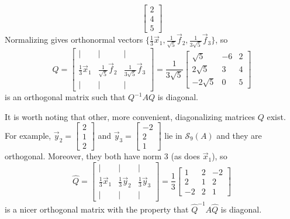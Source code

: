 \documentclass{ximera}
\begin{document}
\begin{example}
\begin{explanation}
\begin{equation*}
\begin{bmatrix}
2 \\
4 \\
5
\end{bmatrix}
\end{equation*}
Normalizing gives orthonormal vectors $\{\frac{1}{3}\vec{x}_{1}, \frac{1}{\sqrt{5}}\vec{f}_{2}, \frac{1}{3\sqrt{5}}\vec{f}_{3}\}$, so
\begin{equation*}
Q = \begin{bmatrix}
| & | &  | \\
\frac{1}{3}\vec{x}_{1} & \frac{1}{\sqrt{5}}\vec{f}_{2} & \frac{1}{3\sqrt{5}}\vec{f}_{3} \\
| & | &  | 
\end{bmatrix} = \frac{1}{3\sqrt{5}}\begin{bmatrix}
\sqrt{5} & -6 & 2 \\
2\sqrt{5} & 3 & 4 \\
-2\sqrt{5} & 0 & 5
\end{bmatrix}
\end{equation*}
is an orthogonal matrix such that $Q^{-1}AQ$ is diagonal.


It is worth noting that other, more convenient, diagonalizing matrices $Q$ exist. For example, $\vec{y}_{2} = \begin{bmatrix}
2 \\
1 \\
2
\end{bmatrix}$ and $\vec{y}_{3} = \begin{bmatrix}
-2 \\
2 \\
1
\end{bmatrix}$
 lie in $\mathcal{S}_{9}(A)$ and they are orthogonal. Moreover, they both have norm $3$ (as does $\vec{x}_{1}$), so
\begin{equation*}
\hat{Q} = \begin{bmatrix}
| & | &  | \\
\frac{1}{3}\vec{x}_{1} & \frac{1}{3}\vec{y}_{2} & \frac{1}{3}\vec{y}_{3} \\
| & | &  |
\end{bmatrix} = \frac{1}{3}\begin{bmatrix}
1 & 2 & -2 \\
2 & 1 & 2 \\
-2 & 2 & 1
\end{bmatrix}
\end{equation*}
is a nicer orthogonal matrix with the property that $\hat{Q}^{-1}A\hat{Q}$ is diagonal.
\end{explanation}
\end{example}
\end{document}
